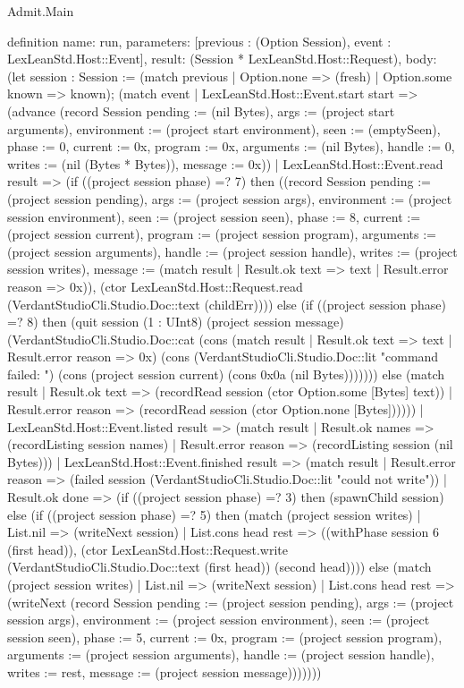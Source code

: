 \begin{lexlean}{Admit.Main}
\begin{semanticmodule}
definition{
  name: run,
  parameters: [previous : (Option Session), event : LexLeanStd.Host::Event],
  result: (Session * LexLeanStd.Host::Request),
  body: (let session : Session := (match previous
      | Option.none => (fresh)
      | Option.some known => known); (match event
    | LexLeanStd.Host::Event.start start => (advance (record Session {pending := (nil Bytes), args := (project start arguments), environment := (project start environment), seen := (emptySeen), phase := 0, current := 0x, program := 0x, arguments := (nil Bytes), handle := 0, writes := (nil (Bytes * Bytes)), message := 0x}))
    | LexLeanStd.Host::Event.read result => (if ((project session phase) =? 7) then ((record Session {pending := (project session pending), args := (project session args), environment := (project session environment), seen := (project session seen), phase := 8, current := (project session current), program := (project session program), arguments := (project session arguments), handle := (project session handle), writes := (project session writes), message := (match result
        | Result.ok text => text
        | Result.error reason => 0x)}), (ctor LexLeanStd.Host::Request.read (VerdantStudioCli.Studio.Doc::text (childErr)))) else (if ((project session phase) =? 8) then (quit session (1 : UInt8) (project session message) (VerdantStudioCli.Studio.Doc::cat (cons (match result
        | Result.ok text => text
        | Result.error reason => 0x) (cons (VerdantStudioCli.Studio.Doc::lit "command failed: ") (cons (project session current) (cons 0x0a (nil Bytes))))))) else (match result
        | Result.ok text => (recordRead session (ctor Option.some [Bytes] text))
        | Result.error reason => (recordRead session (ctor Option.none [Bytes])))))
    | LexLeanStd.Host::Event.listed result => (match result
      | Result.ok names => (recordListing session names)
      | Result.error reason => (recordListing session (nil Bytes)))
    | LexLeanStd.Host::Event.finished result => (match result
      | Result.error reason => (failed session (VerdantStudioCli.Studio.Doc::lit "could not write"))
      | Result.ok done => (if ((project session phase) =? 3) then (spawnChild session) else (if ((project session phase) =? 5) then (match (project session writes)
          | List.nil => (writeNext session)
          | List.cons head rest => ((withPhase session 6 (first head)), (ctor LexLeanStd.Host::Request.write (VerdantStudioCli.Studio.Doc::text (first head)) (second head)))) else (match (project session writes)
          | List.nil => (writeNext session)
          | List.cons head rest => (writeNext (record Session {pending := (project session pending), args := (project session args), environment := (project session environment), seen := (project session seen), phase := 5, current := 0x, program := (project session program), arguments := (project session arguments), handle := (project session handle), writes := rest, message := (project session message)}))))))
}
\end{semanticmodule}
\end{lexlean}
